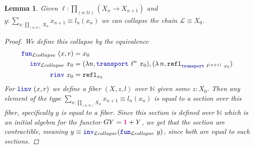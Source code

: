 \documentclass[twoside,11pt,openright]{report}
\theoremstyle{plain} %
\newtheorem{lem}[thm]{Lemma}
\theoremstyle{definition}
\theoremstyle{remark}
\newcommand*{\type}[1]{\textcolor{magenta!90!black}{#1}}
\newcommand*{\unit}{\type{\textbf{1}}}
\newcommand*{\function}[1]{\textcolor{blue!60!black}{\ensuremath{\mathtt{#1}}}}
\begin{document}
\begin{lem} \label{lem:limit-collapse}
  Given \(\ell : \prod_{(n : \mathbb{N})} (X_{n} \rightarrow X_{n+1})\) and \(y : \sum_{x : \prod_{(n : \mathbb{N})} X_n} x_{n + 1} \equiv l_n (x_n)\) we can collapse the chain \(\mathcal{L} \equiv X_0\).
  \begin{proof}
    We define this collapse by the equivalence
    \begin{align}
      \function{fun}_{\mathcal{L}collapse}~(x , r) &= x_0 \\
      \function{inv}_{\mathcal{L}collapse}~x_0 &= (\lambda n, \function{transport}~\ell^n~x_0) , (\lambda\,n, \mathtt{refl}_{\function{transport}~\ell^{(n+1)}~x_0}) \\
      \function{rinv}~x_0 &= \mathtt{refl}_{x_0}
    \end{align}
    For \(\function{linv}~(x , r)\) we define a fiber \((X , z, l)\) over \(\mathbb{N}\) given some \(z : X_0\). Then any element of the type \(\sum_{x : \prod_{(n : \mathbb{N})} X_n} x_{n + 1} \equiv l_n (x_n)\) is equal to a section over this fiber, specifically \(y\) is equal to a fiber. Since this section is defined over \(\mathbb{N}\) which is an initial algebra for the functor \(GY = \unit + Y\), we get that the section are contractible, meaning \(y \equiv \function{inv}_{\mathcal{L}collapse} (\function{fun}_{\mathcal{L}collapse}~y)\), since both are equal to such sections.
\end{proof}
\end{lem}
\end{document}
